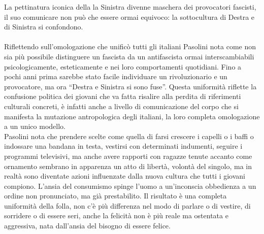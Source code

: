 La pettinatura iconica della la Sinistra divenne maschera dei provocatori fascisti, il suo comunicare non può che essere ormai equivoco: la sottocultura di Destra e di Sinistra si confondono.

\paragraph{}Riflettendo sull'omologazione che unificò tutti gli italiani  Pasolini nota come non sia più possibile distinguere un fascista da un antifascista ormai interscambiabili psicologicamente, esteticamente e nei loro comportamenti quotidiani.
Fino a pochi anni prima sarebbe stato facile individuare un rivoluzionario e un provocatore, ma ora \enquote{Destra e Sinistra si sono fuse}.
Questa uniformità riflette la confusione politica dei giovani che va fatta risalire alla perdita di riferimenti culturali concreti, è infatti anche a livello di comunicazione del corpo che si manifesta la mutazione antropologica degli italiani, la loro completa omologazione a un unico modello.
\\Pasolini nota che prendere scelte come quella di farsi crescere i capelli o i baffi o indossare una bandana in testa, vestirsi con determinati indumenti, seguire i programmi televisivi, ma anche avere rapporti con ragazze tenute accanto come ornamento sembrano in apparenza un atto di libertà, volontà del singolo, ma in realtà sono diventate azioni influenzate dalla nuova cultura che tutti i giovani compiono.
L'ansia del consumismo spinge l'uomo a un'inconscia obbedienza a un ordine non pronunciato, ma già prestabilito.
Il risultato è una completa uniformità della folla, non c'è più differenza nel modo di parlare o di vestire, di sorridere o di essere seri, anche la felicità non è più reale ma ostentata e aggressiva, nata dall'ansia del bisogno di essere felice.

